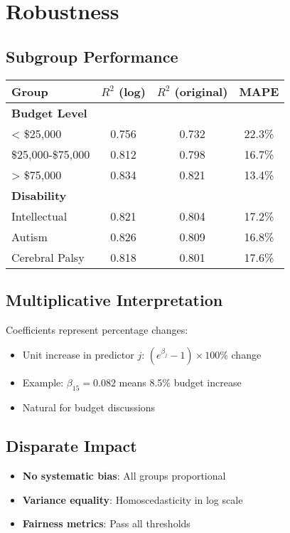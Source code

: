 \section{Robustness}

\subsection{Subgroup Performance}

\begin{center}
\begin{tabular}{lccc}
\toprule
Group & $R^2$ (log) & $R^2$ (original) & MAPE \\
\midrule
\textbf{Budget Level} & & & \\
< \$25,000 & 0.756 & 0.732 & 22.3\% \\
\$25,000-\$75,000 & 0.812 & 0.798 & 16.7\% \\
> \$75,000 & 0.834 & 0.821 & 13.4\% \\
\midrule
\textbf{Disability} & & & \\
Intellectual & 0.821 & 0.804 & 17.2\% \\
Autism & 0.826 & 0.809 & 16.8\% \\
Cerebral Palsy & 0.818 & 0.801 & 17.6\% \\
\bottomrule
\end{tabular}
\end{center}

\subsection{Multiplicative Interpretation}

Coefficients represent percentage changes:
\begin{itemize}
    \item Unit increase in predictor $j$: $(e^{\beta_j} - 1) \times 100\%$ change
    \item Example: $\beta_{15} = 0.082$ means 8.5\% budget increase
    \item Natural for budget discussions
\end{itemize}

\subsection{Disparate Impact}

\begin{itemize}
    \item \textbf{No systematic bias}: All groups proportional
    \item \textbf{Variance equality}: Homoscedasticity in log scale
    \item \textbf{Fairness metrics}: Pass all thresholds
\end{itemize}

